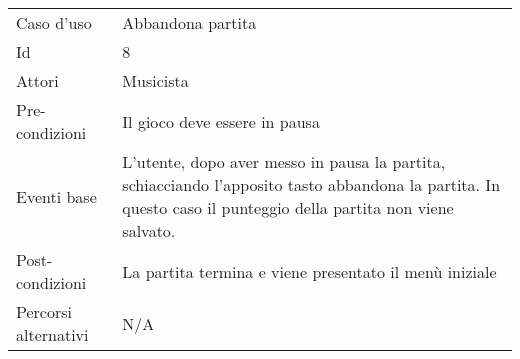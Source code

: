 \begin{center}
                \vspace{2cm}
                \begin{tabular}{ m{10em} | m{20em} }
                    Caso d'uso & Abbandona partita \\
                    Id & 8 \\
                    Attori & Musicista \\
                    Pre-condizioni & Il gioco deve essere in pausa \\
                    Eventi base & L'utente, dopo aver messo in pausa la partita, schiacciando l'apposito tasto abbandona la partita. In questo caso il punteggio della partita non viene salvato.\\
                    Post-condizioni & La partita termina e viene presentato il menù iniziale
                    \\
                    Percorsi alternativi & N/A \\
                \end{tabular}
            \end{center}
